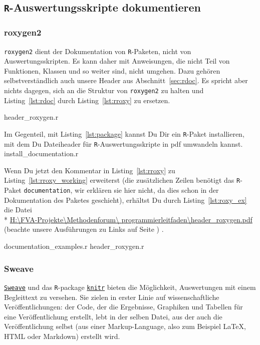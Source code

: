 \documentclass[twoside]{scrreprt}
\providecommand{\R}{\texttt{R}}
\providecommand{\code}[1]{\texttt{#1}}
\providecommand{\proot}{%
H:\textbackslash{}FVA-Projekte\textbackslash{}Methodenforum\textbackslash{}%
}
\providecommand{\pdir}{\proot{}programmierleitfaden\textbackslash{}}
\begin{document}
\subsection{\R{}-Auswertungsskripte dokumentieren
\label{sec:documentation}}
\subsubsection{roxygen2}
\code{roxygen2} dient der Dokumentation von \R{}-Paketen, nicht von
Auswertungsskripten. Es kann daher mit Anweisungen, die nicht Teil von
Funktionen, Klassen und so weiter sind, nicht umgehen. Dazu geh\"oren
selbstverst\"a{}ndlich auch unsere Header aus Abschnitt~\ref{sec:rdoc}.
Es spricht aber nichts dagegen, sich an die Struktur von \code{roxygen2} zu
halten und Listing~\ref{lst:rdoc} durch Listing~\ref{lst:rroxy} zu ersetzen.

{header_roxygen.r}

Im Gegenteil, mit Listing~\ref{lst:package} kannst Du Dir ein \R{}-Paket
installieren, mit dem Du
Dateiheader
f\"u{}r \R{}-Auswertungsskripte in pdf
umwandeln
kannst.
%
{install_documentation.r}

Wenn Du jetzt den Kommentar in  Listing~\ref{lst:rroxy} zu
Listing~\ref{lst:rroxy_working}
erweiterst (die zus\"a{}tzlichen Zeilen ben\"o{}tigt das \R{}-Paket
\code{documentation}, wir erkl\"a{}ren sie hier nicht, da dies schon in der
Dokumentation des Paketes geschieht),
erh\"altst Du durch Listing~\ref{lst:roxy_ex} die Datei \\* 
\href{header_roxygen.pdf}{\pdir{}header\_roxygen.pdf} 
(beachte unsere Ausf\"u{}hrungen zu Links auf Seite \pageref{page:links})
. 

{documentation_examples.r}
%
{header_roxygen.r}

\subsubsection{Sweave}
\href{http://www.stat.uni-muenchen.de/~leisch/Sweave/}{\code{Sweave}} und das
\R{}-package
\href{http://cran.r-project.org/web/packages/knitr/index.html}{\code{knitr}}
bieten die M\"o{}glichkeit, Auswertungen mit einem Begleittext zu versehen.
Sie zielen in erster Linie auf wissenschaftliche Ver\"o{}ffentlichungen: der
Code, der die Ergebnisse, Graphiken und Tabellen f\"u{}r eine
Ver\"o{}ffentlichung erstellt, lebt in der selben Datei, aus der auch die
Ver\"o{}ffentlichung selbst (aus einer Markup-Language, also zum Beispiel
\LaTeX{}, HTML oder Markdown) erstellt wird.
\end{document}
